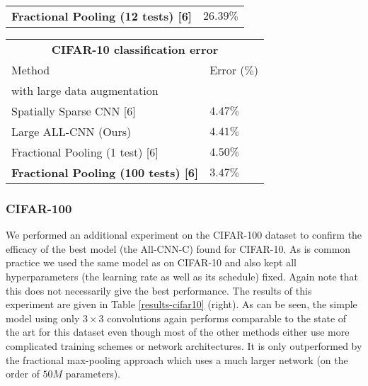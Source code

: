 \documentclass{article} \usepackage{iclr2015,times}
\begin{document}
\begin{table}[h]
\begin{minipage}{0.49\linewidth}
\begin{tabular}{ll}
\textbf{Fractional Pooling (12 tests) [6]}  & $\mathbf{26.39} \%$ \\
\end{tabular}
\begin{tabular}{ll}
\multicolumn{2}{c}{\bf CIFAR-10 classification error} \\
\multicolumn{1}{l}{Method} & \multicolumn{1}{l}{Error ($\%$)} \\
\hline
\multicolumn{2}{l}{with large data augmentation} \\
\hline
Spatially Sparse CNN [6]         & $4.47 \%$  \\
Large ALL-CNN (Ours)         &  $4.41 \%$  \\
Fractional Pooling (1 test) [6]  & $4.50 \%$ \\
\textbf{Fractional Pooling (100 tests) [6]}  & $\mathbf{3.47} \%$ \\
\end{tabular}
\end{minipage}
\end{table}



\subsubsection{CIFAR-100}
We performed an additional experiment on the CIFAR-100 dataset to
confirm the efficacy of the best model (the All-CNN-C) found for
CIFAR-10. As is common practice we used the same model as on CIFAR-10
and also kept all hyperparameters (the learning rate as well as its
schedule) fixed. Again note that this does not necessarily give the
best performance. The results of this experiment are given in Table
\ref{results-cifar10} (right). As can be seen, the simple model using only $3\times3$
convolutions again performs comparable to the state of the art
for this dataset even though most of the other methods either use more
complicated training schemes or network architectures. 
It is only outperformed by the fractional max-pooling approach \citep{Graham2015} which uses
a much larger network (on the order of $50 M$ parameters).
\end{document}
